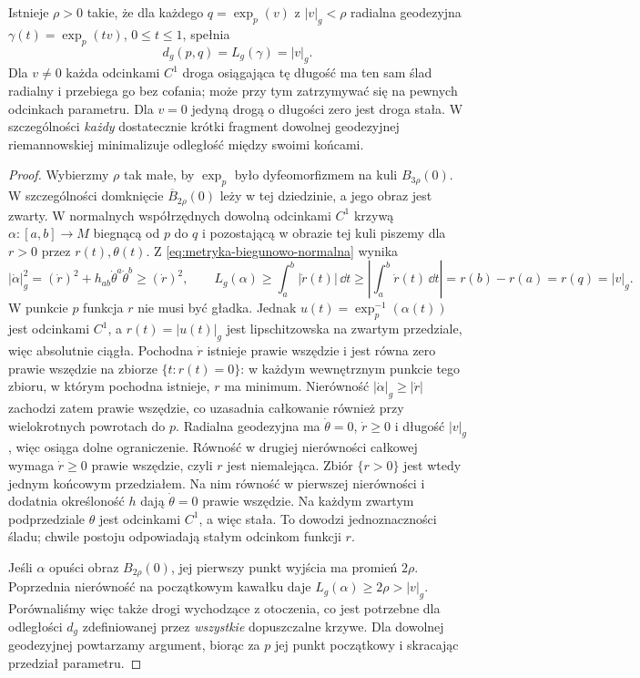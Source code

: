 \begin{twierdzenie}
\label{thm:lokalna-minimalnosc-geodezyjnej}
Istnieje $\rho>0$ takie, że dla każdego
$q=\exp_p(v)$ z $|v|_g<\rho$ radialna
geodezyjna $\gamma(t)=\exp_p(tv)$,
$0\leq t\leq1$, spełnia
\begin{equation}\label{eq:odleglosc-exp-lokalna}
 d_g(p,q)=L_g(\gamma)=|v|_g.
\end{equation}
Dla $v\ne0$ każda odcinkami $C^1$ droga osiągająca tę
długość ma ten sam ślad radialny i przebiega go bez cofania;
może przy tym zatrzymywać się na pewnych odcinkach parametru.
Dla $v=0$ jedyną drogą o długości zero jest droga stała. W szczególności \emph{każdy}
dostatecznie krótki fragment dowolnej
geodezyjnej riemannowskiej minimalizuje
odległość między swoimi końcami.
\end{twierdzenie}
\begin{proof}
Wybierzmy $\rho$ tak małe, by
$\exp_p$ było dyfeomorfizmem na kuli $B_{3\rho}(0)$.
W szczególności domknięcie $\overline B_{2\rho}(0)$
leży w tej dziedzinie, a jego obraz jest zwarty. W normalnych współrzędnych
dowolną odcinkami $C^1$ krzywą $\alpha:[a,b]\to M$
biegnącą od $p$ do $q$ i pozostającą
w obrazie tej kuli piszemy dla $r>0$
przez $r(t),\theta(t)$. Z \eqref{eq:metryka-biegunowo-normalna}
wynika
\[
 |\dot\alpha|_g^2
 =(\dot r)^2+h_{ab}\dot\theta^a\dot\theta^b
 \geq (\dot r)^2,
 \qquad
 L_g(\alpha)\geq\int_a^b|\dot r(t)|\,\dd t
 \geq\left|\int_a^b\dot r(t)\,\dd t\right|
 =r(b)-r(a)=r(q)=|v|_g.
\]
W punkcie $p$ funkcja $r$ nie musi być gładka.
Jednak $u(t)=\exp_p^{-1}(\alpha(t))$ jest odcinkami $C^1$,
a $r(t)=|u(t)|_g$ jest lipschitzowska na zwartym przedziale,
więc absolutnie ciągła. Pochodna $\dot r$ istnieje prawie
wszędzie i jest równa zero prawie wszędzie na zbiorze
$\{t:r(t)=0\}$: w każdym wewnętrznym punkcie tego zbioru,
w którym pochodna istnieje, $r$ ma minimum. Nierówność
$|\dot\alpha|_g\geq|\dot r|$ zachodzi zatem prawie wszędzie,
co uzasadnia całkowanie również przy wielokrotnych powrotach do $p$. Radialna geodezyjna
ma $\dot\theta=0$, $\dot r\geq0$ i długość
$|v|_g$, więc osiąga dolne ograniczenie.
Równość w drugiej nierówności całkowej wymaga
$\dot r\geq0$ prawie wszędzie, czyli $r$ jest niemalejąca.
Zbiór $\{r>0\}$ jest wtedy jednym końcowym przedziałem.
Na nim równość w pierwszej nierówności i dodatnia
określoność $h$ dają $\dot\theta=0$ prawie wszędzie.
Na każdym zwartym podprzedziale $\theta$ jest odcinkami
$C^1$, a więc stała. To dowodzi jednoznaczności śladu;
chwile postoju odpowiadają stałym odcinkom funkcji $r$.

Jeśli $\alpha$ opuści obraz $B_{2\rho}(0)$,
jej pierwszy punkt wyjścia ma promień $2\rho$.
Poprzednia nierówność na początkowym kawałku
daje $L_g(\alpha)\geq2\rho>|v|_g$.
Porównaliśmy więc także drogi wychodzące
z otoczenia, co jest potrzebne dla odległości
$d_g$ zdefiniowanej przez \emph{wszystkie}
dopuszczalne krzywe. Dla dowolnej geodezyjnej
powtarzamy argument, biorąc za $p$ jej punkt
początkowy i skracając przedział parametru.
\end{proof}


